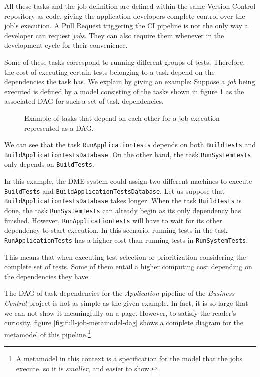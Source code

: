 All these tasks and the job definition are defined within the same
Version Control repository as code, giving the application developers complete 
control over the job's execution. A Pull Request triggering the CI pipeline is not the only way 
a developer can request \emph{jobs}. They can also require them whenever in the development 
cycle for their convenience.

Some of these tasks correspond to running different groups of tests. Therefore, the cost of executing 
certain tests belonging to a task depend on the dependencies the task has.
We explain by giving an example: Suppose a \emph{job} being executed 
is defined by a model consisting of the tasks shown in figure \ref{fig:example-dag-tasks} as the 
associated DAG for such a set of task-dependencies. 

\begin{figure}
    \def\svgwidth{\columnwidth}
    
    \caption{Example of tasks that depend on each other for a job execution represented as a DAG.}
    \label{fig:example-dag-tasks}
\end{figure}

We can see that the task \texttt{RunApplicationTests} depends on both \texttt{BuildTests}
and \texttt{BuildApplicationTestsDatabase}. On the other hand, the task 
\texttt{RunSystemTests} only depends on \texttt{BuildTests}.

In this example, the DME system could assign two different machines to execute 
\texttt{BuildTests} and \texttt{BuildApplicationTestsDatabase}. Let us suppose that\\
\texttt{BuildApplicationTestsDatabase} takes longer. When the task \texttt{BuildTests}
is done, the task \texttt{RunSystemTests} can already begin as its only dependency
has finished. However, \texttt{RunApplicationTests} will have to wait for its other
dependency to start execution. In this scenario, running tests in the task \texttt{RunApplicationTests}
has a higher cost than running tests in \texttt{RunSystemTests}.

This means that when executing test selection or prioritization considering the complete
set of tests. Some of them entail a higher computing cost depending on the dependencies they
have.

The DAG of task-dependencies for the \emph{Application} pipeline of the \emph{Business Central} project is not as simple 
as the given example. In fact, it is so large that we can not show it meaningfully on a
page. However, to satisfy the reader's curiosity, figure \ref{fig:full-job-metamodel-dag} 
shows a complete diagram for the metamodel of this pipeline.\footnote{A 
metamodel in this context is a specification for the model that the jobs execute, so it is \textit{smaller}, and easier to show.}

